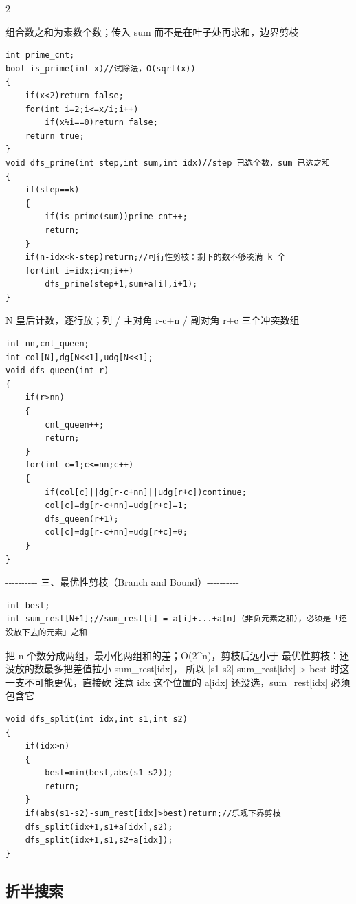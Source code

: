\documentclass[UTF8,fontset=fandol,a4paper,twoside]{ctexart}
\newcommand{\note}[1]{{\fontsize{10}{12}\selectfont #1\par}}
\begin{document}
\begin{multicols}{2}
\note{组合数之和为素数个数；传入 sum 而不是在叶子处再求和，边界剪枝}
\begin{lstlisting}
int prime_cnt;
bool is_prime(int x)//试除法，O(sqrt(x))
{
    if(x<2)return false;
    for(int i=2;i<=x/i;i++)
        if(x%i==0)return false;
    return true;
}
void dfs_prime(int step,int sum,int idx)//step 已选个数，sum 已选之和
{
    if(step==k)
    {
        if(is_prime(sum))prime_cnt++;
        return;
    }
    if(n-idx<k-step)return;//可行性剪枝：剩下的数不够凑满 k 个
    for(int i=idx;i<n;i++)
        dfs_prime(step+1,sum+a[i],i+1);
}
\end{lstlisting}
\note{N 皇后计数，逐行放；列 /\allowbreak{} 主对角 r-\allowbreak{}c+\allowbreak{}n /\allowbreak{} 副对角 r+\allowbreak{}c 三个冲突数组}
\begin{lstlisting}
int nn,cnt_queen;
int col[N],dg[N<<1],udg[N<<1];
void dfs_queen(int r)
{
    if(r>nn)
    {
        cnt_queen++;
        return;
    }
    for(int c=1;c<=nn;c++)
    {
        if(col[c]||dg[r-c+nn]||udg[r+c])continue;
        col[c]=dg[r-c+nn]=udg[r+c]=1;
        dfs_queen(r+1);
        col[c]=dg[r-c+nn]=udg[r+c]=0;
    }
}
\end{lstlisting}
\note{-\allowbreak{}-\allowbreak{}-\allowbreak{}-\allowbreak{}-\allowbreak{}-\allowbreak{}-\allowbreak{}-\allowbreak{}-\allowbreak{}-\allowbreak{} 三、最优性剪枝（Branch and Bound）-\allowbreak{}-\allowbreak{}-\allowbreak{}-\allowbreak{}-\allowbreak{}-\allowbreak{}-\allowbreak{}-\allowbreak{}-\allowbreak{}-\allowbreak{}}
\begin{lstlisting}
int best;
int sum_rest[N+1];//sum_rest[i] = a[i]+...+a[n]（非负元素之和），必须是「还没放下去的元素」之和
\end{lstlisting}
\note{把 n 个数分成两组，最小化两组和的差；O(\allowbreak{}2\textasciicircum{}n)\allowbreak{}，剪枝后远小于 最优性剪枝：还没放的数最多把差值拉小 sum\_rest[\allowbreak{}idx]\allowbreak{}， 所以 |s1-\allowbreak{}s2|-\allowbreak{}sum\_rest[\allowbreak{}idx]\allowbreak{} >\allowbreak{} best 时这一支不可能更优，直接砍 注意 idx 这个位置的 a[\allowbreak{}idx]\allowbreak{} 还没选，sum\_rest[\allowbreak{}idx]\allowbreak{} 必须包含它}
\begin{lstlisting}
void dfs_split(int idx,int s1,int s2)
{
    if(idx>n)
    {
        best=min(best,abs(s1-s2));
        return;
    }
    if(abs(s1-s2)-sum_rest[idx]>best)return;//乐观下界剪枝
    dfs_split(idx+1,s1+a[idx],s2);
    dfs_split(idx+1,s1,s2+a[idx]);
}
\end{lstlisting}
\subsection{折半搜索}


\end{multicols}
\end{document}
